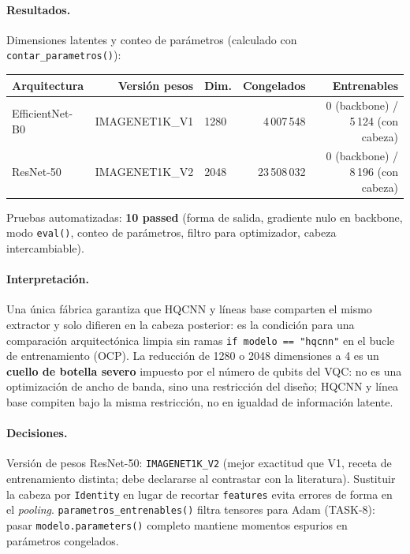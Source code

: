 \paragraph{Resultados.}
Dimensiones latentes y conteo de parámetros (calculado con \texttt{contar\_parametros()}):

\begin{center}
\small
\begin{tabular}{lrlrr}\hline
\textbf{Arquitectura} & \textbf{Versión pesos} & \textbf{Dim.} & \textbf{Congelados} & \textbf{Entrenables} \\\hline
EfficientNet-B0 & IMAGENET1K\_V1 & 1280 & 4\,007\,548 & 0 (backbone) / 5\,124 (con cabeza) \\
ResNet-50 & IMAGENET1K\_V2 & 2048 & 23\,508\,032 & 0 (backbone) / 8\,196 (con cabeza) \\\hline
\end{tabular}
\end{center}

Pruebas automatizadas: \textbf{10 passed} (forma de salida, gradiente nulo en backbone,
modo \texttt{eval()}, conteo de parámetros, filtro para optimizador, cabeza intercambiable).

\paragraph{Interpretación.}
Una única fábrica garantiza que HQCNN y líneas base comparten el mismo extractor y solo
difieren en la cabeza posterior: es la condición para una comparación arquitectónica limpia
sin ramas \texttt{if modelo == "hqcnn"} en el bucle de entrenamiento (OCP). La reducción
de 1280 o 2048 dimensiones a 4 es un \textbf{cuello de botella severo} impuesto por el
número de qubits del VQC: no es una optimización de ancho de banda, sino una restricción
del diseño; HQCNN y línea base compiten bajo la misma restricción, no en igualdad de
información latente.

\paragraph{Decisiones.}
Versión de pesos ResNet-50: \texttt{IMAGENET1K\_V2} (mejor exactitud que V1, receta de
entrenamiento distinta; debe declararse al contrastar con la literatura). Sustituir la cabeza
por \texttt{Identity} en lugar de recortar \texttt{features} evita errores de forma en el
\textit{pooling}. \texttt{parametros\_entrenables()} filtra tensores para Adam (TASK-8):
pasar \texttt{modelo.parameters()} completo mantiene momentos espurios en parámetros
congelados.

